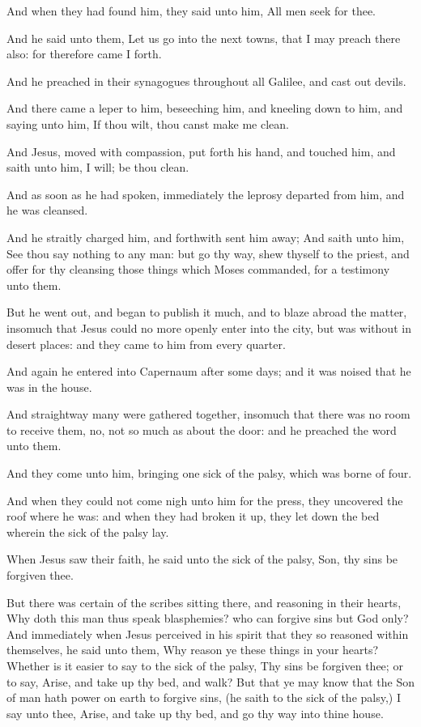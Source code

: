 \Verse And when they had found him, they said unto him, All men seek for thee.

\Verse And he said unto them, Let us go into the next towns, that I may preach there also: for therefore came I forth.

\Verse And he preached in their synagogues throughout all Galilee, and cast out devils.

\Verse And there came a leper to him, beseeching him, and kneeling down to him, and saying unto him, If thou wilt, thou canst make me clean.

\Verse And Jesus, moved with compassion, put forth his hand, and touched him, and saith unto him, I will; be thou clean.

\Verse And as soon as he had spoken, immediately the leprosy departed from him, and he was cleansed.

\Verse And he straitly charged him, and forthwith sent him away; \Verse And saith unto him, See thou say nothing to any man: but go thy way, shew thyself to the priest, and offer for thy cleansing those things which Moses commanded, for a testimony unto them.

\Verse But he went out, and began to publish it much, and to blaze abroad the matter, insomuch that Jesus could no more openly enter into the city, but was without in desert places: and they came to him from every quarter.


\Chapter
\Verse And again he entered into Capernaum after some days; and it was noised that he was in the house.

\Verse And straightway many were gathered together, insomuch that there was no room to receive them, no, not so much as about the door: and he preached the word unto them.

\Verse And they come unto him, bringing one sick of the palsy, which was borne of four.

\Verse And when they could not come nigh unto him for the press, they uncovered the roof where he was: and when they had broken it up, they let down the bed wherein the sick of the palsy lay.

\Verse When Jesus saw their faith, he said unto the sick of the palsy, Son, thy sins be forgiven thee.

\Verse But there was certain of the scribes sitting there, and reasoning in their hearts, \Verse Why doth this man thus speak blasphemies? who can forgive sins but God only?  \Verse And immediately when Jesus perceived in his spirit that they so reasoned within themselves, he said unto them, Why reason ye these things in your hearts?  \Verse Whether is it easier to say to the sick of the palsy, Thy sins be forgiven thee; or to say, Arise, and take up thy bed, and walk?  \Verse But that ye may know that the Son of man hath power on earth to forgive sins, (he saith to the sick of the palsy,) \Verse I say unto thee, Arise, and take up thy bed, and go thy way into thine house.


